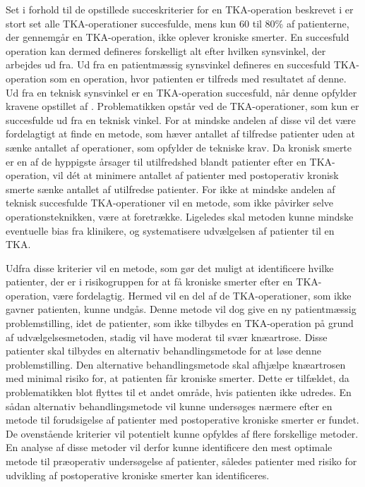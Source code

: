 Set i forhold til de opstillede succeskriterier for en TKA-operation beskrevet i  er stort set alle TKA-operationer succesfulde, mens kun 60 til 80\% af patienterne, der gennemgår en TKA-operation, ikke oplever kroniske smerter. \citep{Sakellariou2016} \citep{Petersen2015} En succesfuld operation kan dermed defineres forskelligt alt efter hvilken synsvinkel, der arbejdes ud fra. Ud fra en patientmæssig synsvinkel defineres en succesfuld TKA-operation som en operation, hvor patienten er tilfreds med resultatet af denne. Ud fra en teknisk synsvinkel er en TKA-operation succesfuld, når denne opfylder kravene opstillet af . Problematikken opstår ved de TKA-operationer, som kun er succesfulde ud fra en teknisk vinkel. For at mindske andelen af disse vil det være fordelagtigt at finde en metode, som hæver antallet af tilfredse patienter uden at sænke antallet af operationer, som opfylder de tekniske krav. Da kronisk smerte er en af de hyppigste årsager til utilfredshed blandt patienter efter en TKA-operation, vil dét at minimere antallet af patienter med postoperativ kronisk smerte sænke antallet af utilfredse patienter. \citep{Bourne2010} For ikke at mindske andelen af teknisk succesfulde TKA-operationer vil en metode, som ikke påvirker selve operationsteknikken, være at foretrække. Ligeledes skal metoden kunne mindske eventuelle bias fra klinikere, og systematisere udvælgelsen af patienter til en TKA. 

Udfra disse kriterier vil en metode, som gør det muligt at identificere hvilke patienter, der er i risikogruppen for at få kroniske smerter efter en TKA-operation, være fordelagtig. Hermed vil en del af de TKA-operationer, som ikke gavner patienten, kunne undgås. Denne metode vil dog give en ny patientmæssig problemstilling, idet de patienter, som ikke tilbydes en TKA-operation på grund af udvælgelsesmetoden, stadig vil have moderat til svær knæartrose. Disse patienter skal tilbydes en alternativ behandlingsmetode for at løse denne problemstilling. Den alternative behandlingsmetode skal afhjælpe knæartrosen med minimal risiko for, at patienten får kroniske smerter. Dette er tilfældet, da problematikken blot flyttes til et andet område, hvis patienten ikke udredes. En sådan alternativ behandlingsmetode vil kunne undersøges nærmere efter en metode til forudsigelse af patienter med postoperative kroniske smerter er fundet. \\  
De ovenstående kriterier vil potentielt kunne opfyldes af flere forskellige metoder. En analyse af disse metoder vil derfor kunne identificere den mest optimale metode til præoperativ undersøgelse af patienter, således patienter med risiko for udvikling af postoperative kroniske smerter kan identificeres.        

